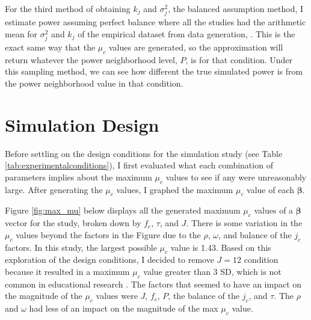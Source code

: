 For the third method of obtaining $k_j$ and $\sigma_j^2$, the balanced assumption method, I estimate power assuming perfect balance where all the studies had the arithmetic mean for $\sigma_j^2$ and $k_j$ of the empirical dataset from data generation, \textcite{WilliamsRyan2022HiMI}. This is the exact same way that the $\mu_c$ values are generated, so the approximation will return whatever the power neighborhood level, $P$,  is for that condition. Under this sampling method, we can see how different the true simulated power is from the power neighborhood value in that condition. 

\section{Simulation Design}\label{sec:simulationdesgin}

Before settling on the design conditions for the simulation study (see Table \ref{tab:experimentalconditions}), I first evaluated what each combination of parameters implies about the maximum $\mu_c$ values to see if any were unreasonably large. After generating the $\mu_c$ values, I graphed the maximum $\mu_c$ value of each $\bm{\beta}$.

Figure \ref{fig:max_mu} below displays all the generated maximum $\mu_c$ values of a $\bm{\beta}$ vector for the study, broken down by $f_c$, $\tau$, and $J$. There is some variation in the $\mu_c$ values beyond the factors in the Figure due to the $\rho$, $\omega$, and balance of the $j_c$ factors. In this study, the largest possible $\mu_c$ value is 1.43. Based on this exploration of the design conditions, I decided to remove $J=12$ condition because it resulted in a maximum $\mu_c$ value greater than 3 SD, which is not common in educational research \autocite{KraftMatthewA.2020IESo}.  The factors that seemed to have an impact on the magnitude of the $\mu_c$ values were $J$, $f_c$, $P$, the balance of the $j_c$, and $\tau$. The $\rho$ and $\omega$ had less of an impact on the magnitude of the max $\mu_c$ value. 



